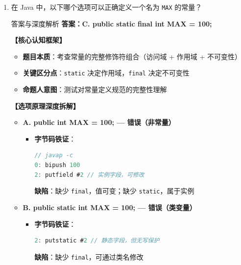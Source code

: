 ﻿\documentclass[12pt, a4paper]{ctexart}
\newcommand{\code}[1]{\texttt{#1}}
\begin{document}
\begin{enumerate}[label=\arabic*., itemsep=1.5em]
\begin{bluebox}{答案与深度解析}
		      \textbf{【命题趋势与实战策略】}
		      \begin{itemize}[leftmargin=*, nosep]
			      \item \textbf{考场秒杀}：记口诀 "开发大，运行中，虚拟机最小"
		      \end{itemize}
	      \end{bluebox}

	\item 在 Java 中，以下哪个选项可以正确定义一个名为 \code{MAX} 的常量？
	      \begin{bluebox}{答案与深度解析}
		      \textbf{答案：C. public static final int MAX = 100;}

		      \textbf{【核心认知框架】}
		      \begin{itemize}[leftmargin=*, nosep]
			      \item \textbf{题目本质}：考查常量的完整修饰符组合（访问域 + 作用域 + 不可变性）
			      \item \textbf{关键区分点}：\code{static} 决定作用域，\code{final} 决定不可变性
			      \item \textbf{命题人意图}：测试对常量定义规范的完整性理解
		      \end{itemize}

		      \textbf{【选项原理深度拆解】}
		      \begin{itemize}[leftmargin=*, nosep]
			      \item \textbf{A. public int MAX = 100; — 错误（非常量）}
			            \begin{itemize}[leftmargin=*, nosep]
				            \item \textbf{字节码铁证}：
				                  \begin{lstlisting}[language=Java]
// javap -c
0: bipush 100
2: putfield #2 // 实例字段，可修改
                \end{lstlisting}
				                  \textbf{缺陷}：缺少 \code{final}，值可变；缺少 \code{static}，属于实例
			            \end{itemize}

			      \item \textbf{B. public static int MAX = 100; — 错误（类变量）}
			            \begin{itemize}[leftmargin=*, nosep]
				            \item \textbf{字节码铁证}：
				                  \begin{lstlisting}[language=Java]
2: putstatic #2 // 静态字段，但无写保护
                \end{lstlisting}
				                  \textbf{缺陷}：缺少 \code{final}，可通过类名修改
			            \end{itemize}


\end{itemize}
\end{bluebox}
\end{enumerate}
\end{document}
